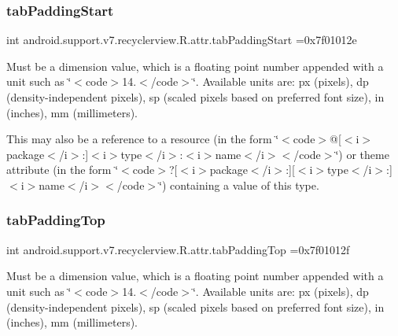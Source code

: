 \subsubsection{\texorpdfstring{tab\+Padding\+Start}{tabPaddingStart}}
{\footnotesize\ttfamily int android.\+support.\+v7.\+recyclerview.\+R.\+attr.\+tab\+Padding\+Start =0x7f01012e\hspace{0.3cm}{\ttfamily [static]}}

Must be a dimension value, which is a floating point number appended with a unit such as \char`\"{}$<$code$>$14.\+5sp$<$/code$>$\char`\"{}. Available units are\+: px (pixels), dp (density-\/independent pixels), sp (scaled pixels based on preferred font size), in (inches), mm (millimeters). 

This may also be a reference to a resource (in the form \char`\"{}$<$code$>$@\mbox{[}$<$i$>$package$<$/i$>$\+:\mbox{]}$<$i$>$type$<$/i$>$\+:$<$i$>$name$<$/i$>$$<$/code$>$\char`\"{}) or theme attribute (in the form \char`\"{}$<$code$>$?\mbox{[}$<$i$>$package$<$/i$>$\+:\mbox{]}\mbox{[}$<$i$>$type$<$/i$>$\+:\mbox{]}$<$i$>$name$<$/i$>$$<$/code$>$\char`\"{}) containing a value of this type. \mbox{\label{classandroid_1_1support_1_1v7_1_1recyclerview_1_1R_1_1attr_a400cf27a68fdea17480438f87a3bff8d}} 
\subsubsection{\texorpdfstring{tab\+Padding\+Top}{tabPaddingTop}}
{\footnotesize\ttfamily int android.\+support.\+v7.\+recyclerview.\+R.\+attr.\+tab\+Padding\+Top =0x7f01012f\hspace{0.3cm}{\ttfamily [static]}}

Must be a dimension value, which is a floating point number appended with a unit such as \char`\"{}$<$code$>$14.\+5sp$<$/code$>$\char`\"{}. Available units are\+: px (pixels), dp (density-\/independent pixels), sp (scaled pixels based on preferred font size), in (inches), mm (millimeters). 

